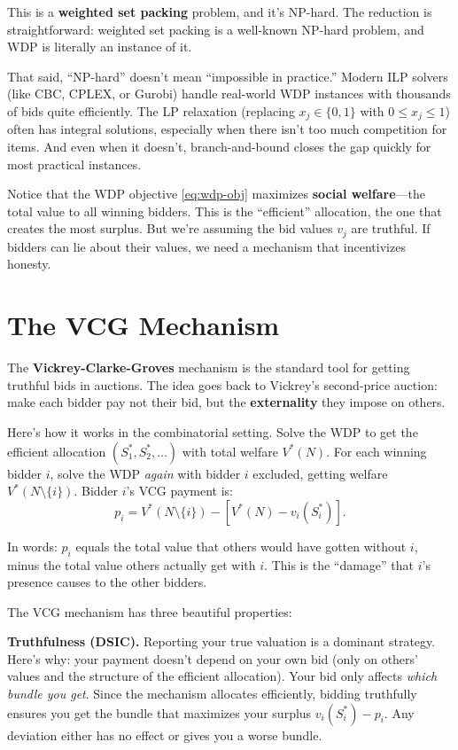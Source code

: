\documentclass[11pt]{article}
\begin{document}
This is a \textbf{weighted set packing} problem, and it's NP-hard. The reduction is straightforward: weighted set packing is a well-known NP-hard problem, and WDP is literally an instance of it.

That said, ``NP-hard'' doesn't mean ``impossible in practice.'' Modern ILP solvers (like CBC, CPLEX, or Gurobi) handle real-world WDP instances with thousands of bids quite efficiently. The LP relaxation (replacing $x_j \in \{0,1\}$ with $0 \leq x_j \leq 1$) often has integral solutions, especially when there isn't too much competition for items. And even when it doesn't, branch-and-bound closes the gap quickly for most practical instances.

Notice that the WDP objective \eqref{eq:wdp-obj} maximizes \textbf{social welfare}---the total value to all winning bidders. This is the ``efficient'' allocation, the one that creates the most surplus. But we're assuming the bid values $v_j$ are truthful. If bidders can lie about their values, we need a mechanism that incentivizes honesty.

\section{The VCG Mechanism}

The \textbf{Vickrey-Clarke-Groves} mechanism is the standard tool for getting truthful bids in auctions. The idea goes back to Vickrey's second-price auction: make each bidder pay not their bid, but the \textbf{externality} they impose on others.

Here's how it works in the combinatorial setting. Solve the WDP to get the efficient allocation $(S_1^*, S_2^*, \ldots)$ with total welfare $V^*(N)$. For each winning bidder $i$, solve the WDP \emph{again} with bidder $i$ excluded, getting welfare $V^*(N \setminus \{i\})$. Bidder $i$'s VCG payment is:
\[
p_i = V^*(N \setminus \{i\}) - \left[V^*(N) - v_i(S_i^*)\right].
\]

In words: $p_i$ equals the total value that others would have gotten without $i$, minus the total value others actually get with $i$. This is the ``damage'' that $i$'s presence causes to the other bidders.

The VCG mechanism has three beautiful properties:

\textbf{Truthfulness (DSIC).} Reporting your true valuation is a dominant strategy. Here's why: your payment doesn't depend on your own bid (only on others' values and the structure of the efficient allocation). Your bid only affects \emph{which bundle you get}. Since the mechanism allocates efficiently, bidding truthfully ensures you get the bundle that maximizes your surplus $v_i(S_i^*) - p_i$. Any deviation either has no effect or gives you a worse bundle.
\end{document}
